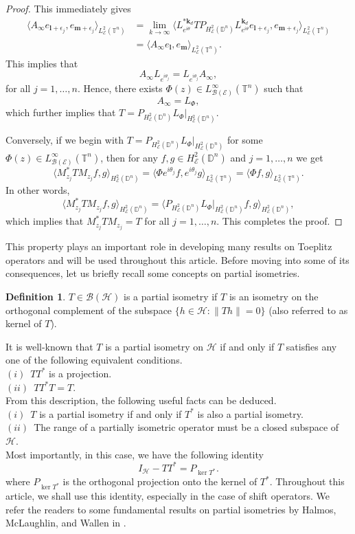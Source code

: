 \documentclass[12pt]{amsart}
\theoremstyle{definition}
\newtheorem{defn}[propn]{Definition}
\newcommand{\D}{\mathbb{D}}
\newcommand{\1}{{\mbox{\bf 1}}}
\newcommand{\clb}{\mathcal{B}}
\newcommand{\cle}{\mathcal{E}}
\newcommand{\clh}{\mathcal{H}}
\newcommand{\raro}{\rightarrow}
\begin{document}
\begin{proof}
This immediately gives
\begin{align*}
\langle A_{\infty} e_{\bm{l} + \epsilon_j}, e_{\bm{m} + \epsilon_j} \rangle_{L_{\cle}^2(\mathbb{T}^n)} &= \lim_{k \raro \infty} \langle L_{e^{i \theta}}^{* \bm{k}_d} T P_{H_{\cle}^2(\D^n)} L_{e^{i \theta}}^{\bm{k}_d} e_{\bm{l} + \epsilon_j}, e_{\bm{m} + \epsilon_j} \rangle_{L_{\cle}^2(\mathbb{T}^n)} \\
&= \langle A_{\infty} e_{\bm{l}}, e_{\bm{m} } \rangle_{L_{\cle}^2(\mathbb{T}^n)}.
\end{align*}
This implies that
\[
A_{\infty}L_{e^{i \theta_j}} = L_{e^{i \theta_j}} A_{\infty},
\]
for all $j=1,\ldots,n$. Hence, there exists $\Phi(z) \in L_{\clb(\cle)}^{\infty}(\mathbb{T}^n)$ such that
\[
A_{\infty} = L_{\Phi},
\]
which further implies that $T = P_{H_{\cle}^2(\D^n)} L_{\Phi}|_{H_{\cle}^2(\D^n)}$. 

Conversely, if we begin with $T = P_{H_{\cle}^2(\D^n)} L_{\Phi}|_{H_{\cle}^2(\D^n)}$ for some $\Phi(z) \in L_{\clb(\cle)}^{\infty}(\mathbb{T}^n)$, then for any $f,g \in H_{\cle}^2(\D^n)$ and $j=1,\ldots,n$ we get
\[
\langle M_{z_j}^* TM_{z_j}f,g \rangle_{H_{\cle}^2(\D^n)} = \langle \Phi e^{i \theta_j}f, e^{i \theta_j}g \rangle_{L_{\cle}^2(\mathbb{T}^n)} = \langle \Phi f, g \rangle_{L_{\cle}^2(\mathbb{T}^n)}.
\]
In other words, 
\[
\langle M_{z_j}^* TM_{z_j}f,g \rangle_{H_{\cle}^2(\D^n)} = \langle P_{H_{\cle}^2(\D^n)} L_{\Phi}|_{H_{\cle}^2(\D^n)}f,g \rangle_{H_{\cle}^2(\D^n)},
\]
which implies that $M_{z_j}^* T M_{z_j} = T$ for all $j=1,\ldots,n$. This completes the proof.
\end{proof}
This property plays an important role in developing many results on Toeplitz operators and will be used throughout this article.  Before moving into some of its consequences, let us briefly recall some concepts on partial isometries.
\begin{defn}
$T \in \clb(\clh)$ is a partial isometry if $T$ is an isometry on the orthogonal complement of the subspace $\{h \in \clh: \|Th\|=0\}$ (also referred to as kernel of $T$).
\end{defn}
It is well-known that $T$ is a partial isometry on $\clh$ if and only if $T$ satisfies any one of the following equivalent conditions.\\
$(i)$~$TT^*$ is a projection.\\
$(ii)$~$TT^*T = T$.\\
From this description, the following useful facts can be deduced.\\
$(i)$~$T$ is a partial isometry if and only if $T^*$ is also a partial isometry.\\
$(ii)$~The range of a partially isometric operator must be a closed subspace of $\clh$.\\
Most importantly, in this case, we have the following identity
\begin{equation}\label{pi}
I_{\clh} - TT^* = P_{\ker T^*}.
\end{equation}
where $P_{\ker T^*}$ is the orthogonal projection onto the kernel of $T^*$. Throughout this article, we shall use this identity, especially in the case of shift operators. We refer the readers to some fundamental results on partial isometries by Halmos, McLaughlin, and Wallen in \cite{HM, HW}.
\end{document}
